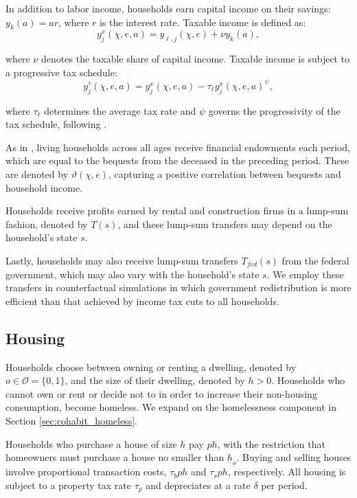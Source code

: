 \documentclass[parskip=full]{article}
\begin{document}
In addition to labor income, households earn capital income on their savings: $y_{k}(a)=ar$, where $r$ is the interest rate. Taxable income is defined as:
\begin{equation*}\label{eq:taxable_labor_income}
  y^{x}_{j}(\chi,e,a) =y_{\ell,j}(\chi,e)+\nu y_{k}(a),
\end{equation*}

\noindent where $\nu$ denotes the taxable share of capital income. Taxable income is subject to a progressive tax schedule:
\begin{equation}\label{eq:income_tax}
  y^{\tau}_{j}(\chi,e,a) = y^{x}_{j}(\chi,e,a)-\tau_{\ell}y^{x}_{j}(\chi,e,a)^{\psi},
\end{equation}

\noindent where $\tau_{\ell}$ determines the average tax rate and $\psi$ governs the progressivity of the tax schedule, following \citep{hsv-2020}.

As in \citet{kkk-2021}, living households across all ages receive financial endowments each period, which are equal to the bequests from the deceased in the preceding period. These are denoted by $\vartheta (\chi,e)$, capturing a positive correlation between bequests and household income.

Households receive profits earned by rental and construction firms in a lump-sum fashion, denoted by $T(s)$, and these lump-sum transfers may depend on the household's state $s$. 

Lastly, households may also receive lump-sum transfers $T_{fed}(s)$ from the federal government, which may also vary with the household’s state $s$. We employ these transfers in counterfactual simulations in which government redistribution is more efficient than that achieved by income tax cuts to all households.

\subsection{Housing}\label{subsection:housing_choice}

Households choose between owning or renting a dwelling, denoted by $o \in \mathcal{O}=\{0,1\}$, and the size of their dwelling, denoted by $h>0$. Households who cannot own or rent or decide not to in order to increase their non-housing consumption, become homeless. We expand on the homelessness component in Section \ref{sec:cohabit_homeless}.

Households who purchase a house of size $h$ pay $p h$, with the restriction that homeowners must purchase a house no smaller than $\underline{h}_{o}$. Buying and selling houses involve proportional transaction costs, $\tau_{b} p h$ and $\tau_{s} p h$, respectively. All housing is subject to a property tax rate $\tau_{p}$ and depreciates at a rate $\delta$ per period. 
\end{document}
